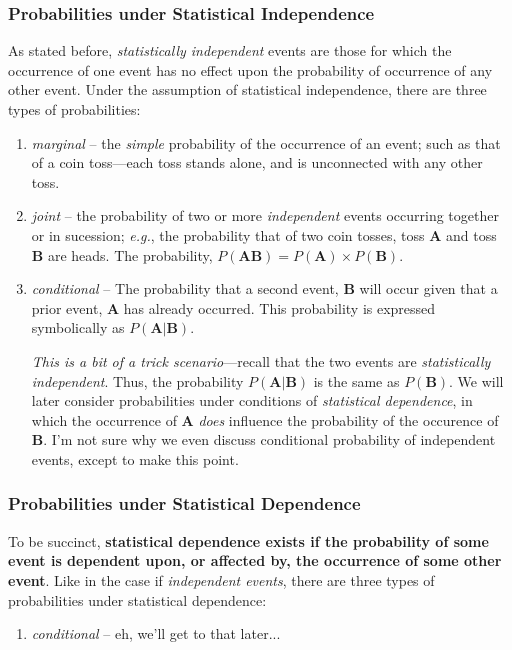 \documentclass[12pt]{article}
\begin{document}
\subsubsection{Probabilities under Statistical Independence}
As stated before, \textit{statistically independent} events are those for which the occurrence of one event has no effect upon the probability of occurrence of any other event. Under the assumption of statistical independence, there are three types of probabilities:
\begin{enumerate}
\item \textit{marginal} -- the \textit{simple} probability of the occurrence of an event; such as that of a coin toss---each toss stands alone, and is unconnected with any other toss.
\item \textit{joint} -- the probability of two or more \textit{independent} events occurring together or in sucession; \textit{e.g.}, the probability that of two coin tosses, toss \textbf{A} and toss \textbf{B} are heads. The probability, $P(\textbf{AB}) = P(\textbf{A}) \times P(\textbf{B})$.
\item \textit{conditional} -- The probability that a second event, \textbf{B} will occur given that a prior event, \textbf{A} has already occurred. This probability is expressed symbolically as $P(\textbf{A}|\textbf{B})$. 

\textit{This is a bit of a trick scenario}---recall that the two events are \textit{statistically independent}. Thus, the probability $P(\textbf{A}|\textbf{B})$ is the same as $P(\textbf{B})$. We will later consider probabilities under conditions of \textit{statistical dependence}, in which the occurrence of \textbf{A} \textit{does} influence the probability of the occurence of \textbf{B}. I'm not sure why we even discuss conditional probability of independent events, except to make this point.
\end{enumerate}

\subsubsection{Probabilities under Statistical Dependence}
To be succinct, \textbf{statistical dependence exists if the probability of some event is dependent upon, or affected by, the occurrence of some other event}. Like in the case if \textit{independent events}, there are three types of probabilities under statistical dependence:
\begin{enumerate}
\item \textit{conditional} -- eh, we'll get to that later...
\end{enumerate}
\end{document}

